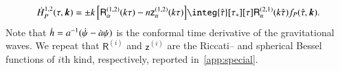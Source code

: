     \begin{equation}\label{eq:pertwalls:gws:Hdot_P_12}
        \dot{H}_P^{1,2}(\tau, \vec{k})  = \pm k \,\bclosed{ \mathsf{R}_\alpha^{(1,2)}(k\tau) -  n\mathsf{z}^{(1,2)}_n(k\tau) } \integ{\dummy{\tau}}[\tau_\ast][\tau] \mathsf{R}_n^{(2,1)}(k\dummy{\tau})  \Src_P(\dummy{\tau}, \vec{k}).
    \end{equation}
    Note that $\dot{h} = a^{-1} ( \dot{\psi} - \dot{a} \psi)$ is the conformal time derivative of the gravitational waves. 
    We repeat that $\mathsf{R}^{(i)}$ and $\mathsf{z}^{(i)}$ are the Riccati-- and spherical Bessel functions of $i$th kind, respectively, reported in~\cref{app:special}.






